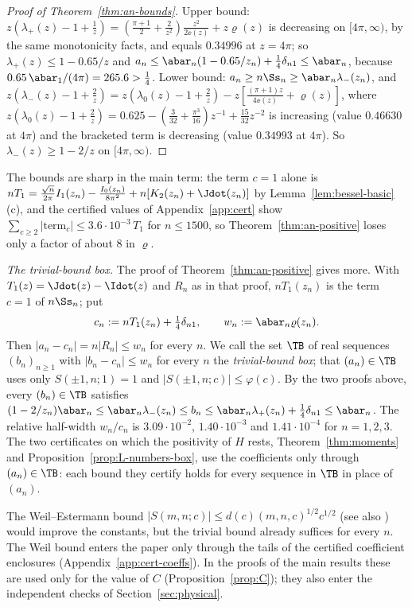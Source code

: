\begin{proof}[Proof of Theorem~\ref{thm:an-bounds}]
Upper bound: $z(\lambda_+(z)-1+\frac1z)=(\frac{\pi+1}2+\frac2{z^2})\frac{z^2}{2\ee(z)}+z\varrho(z)$ is decreasing on $[4\pi,\infty)$, by the same monotonicity
facts, and equals $0.34996$ at $z=4\pi$; so $\lambda_+(z)\le1-0.65/z$ and $a_n\le\abar_n(1-0.65/z_n)+\frac14\delta_{n1}\le\abar_n$, because
$0.65\,\abar_1/(4\pi)=265.6>\frac14$. Lower bound: $a_n\ge n\Ss_n\ge\abar_n\lambda_-(z_n)$, and
$z(\lambda_-(z)-1+\frac2z)=z(\lambda_0(z)-1+\frac2z)-z[\frac{(\pi+1)z}{4\ee(z)}+\varrho(z)]$, where
$z(\lambda_0(z)-1+\frac2z)=0.625-(\frac3{32}+\frac{\pi^3}{16})z^{-1}+\frac{15}{32}z^{-2}$ is increasing (value $0.46630$ at $4\pi$) and the bracketed term
is decreasing (value $0.34993$ at $4\pi$). So $\lambda_-(z)\ge1-2/z$ on $[4\pi,\infty)$.
\end{proof}

The bounds are sharp in the main term: the term $c=1$ alone is $nT_1=\frac{\sqrt n}{2\pi}I_1(z_n)-\frac{I_0(z_n)}{8\pi^2}+n[K_2(z_n)+\Jdot(z_n)]$ by
Lemma~\ref{lem:bessel-basic}(c), and the certified values of Appendix~\ref{app:cert} show $\sum_{c\ge2}|\text{term}_c|\le3.6\cdot10^{-3}\,T_1$ for
$n\le1500$, so Theorem~\ref{thm:an-positive} loses only a factor of about $8$ in $\varrho$.

\emph{The trivial-bound box.} The proof of Theorem~\ref{thm:an-positive} gives more. With $T_1(z)=\Jdot(z)-\Idot(z)$ and $R_n$ as in that proof,
$nT_1(z_n)$ is the term $c=1$ of $n\Ss_n$; put
\begin{equation}\label{eq:box}
c_n:=nT_1(z_n)+\tfrac14\delta_{n1},\qquad w_n:=\abar_n\varrho(z_n).
\end{equation}
Then $|a_n-c_n|=n|R_n|\le w_n$ for every $n$. We call the set $\TB$ of real sequences $(b_n)_{n\ge1}$ with $|b_n-c_n|\le w_n$ for every $n$ the
\emph{trivial-bound box}; that $(a_n)\in\TB$ uses only $S(\pm1,n;1)=1$ and $|S(\pm1,n;c)|\le\varphi(c)$. By the two proofs above, every
$(b_n)\in\TB$ satisfies $(1-2/z_n)\abar_n\le\abar_n\lambda_-(z_n)\le b_n\le\abar_n\lambda_+(z_n)+\frac14\delta_{n1}\le\abar_n$. The relative
half-width $w_n/c_n$ is $3.09\cdot10^{-2}$, $1.40\cdot10^{-3}$ and $1.41\cdot10^{-4}$ for $n=1,2,3$. The two certificates on which the positivity
of $H$ rests, Theorem~\ref{thm:moments} and Proposition~\ref{prop:L-numbers-box}, use the coefficients only through $(a_n)\in\TB$: each bound they
certify holds for every sequence in $\TB$ in place of $(a_n)$.

\begin{remark}
The Weil--Estermann bound $|S(m,n;c)|\le d(c)(m,n,c)^{1/2}c^{1/2}$ \cite{Wei48,Est61} (see also \cite[Chapter~11]{IK04}) would improve the constants, but
the trivial bound already suffices for every $n$. The Weil bound enters the paper only through the tails of the certified coefficient
enclosures (Appendix~\ref{app:cert-coeffs}). In the proofs of the main results these are used only for the value of $C$
(Proposition~\ref{prop:C}); they also enter the independent checks of Section~\ref{sec:physical}.
\end{remark}


